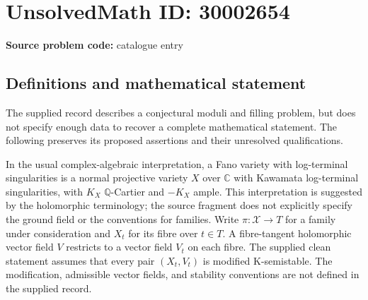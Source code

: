 \documentclass[11pt]{article}
\newcommand{\Q}{\mathbb{Q}}
\newcommand{\C}{\mathbb{C}}
\begin{document}
\section*{UnsolvedMath ID: 30002654}
\textbf{Source problem code:} catalogue entry
\subsection{Definitions and mathematical statement}
The supplied record describes a conjectural moduli and filling problem, but does not specify enough data to recover a complete mathematical statement. The following preserves its proposed assertions and their unresolved qualifications.

In the usual complex-algebraic interpretation, a Fano variety with log-terminal singularities is a normal projective variety \(X\) over \(\C\) with Kawamata log-terminal singularities, with \(K_X\) \(\Q\)-Cartier and \(-K_X\) ample. This interpretation is suggested by the holomorphic terminology; the source fragment does not explicitly specify the ground field or the conventions for families. Write \(\pi\colon\mathcal X\to T\) for a family under consideration and \(X_t\) for its fibre over \(t\in T\). A fibre-tangent holomorphic vector field \(V\) restricts to a vector field \(V_t\) on each fibre. The supplied clean statement assumes that every pair \((X_t,V_t)\) is modified K-semistable. The modification, admissible vector fields, and stability conventions are not defined in the supplied record.
\end{document}
